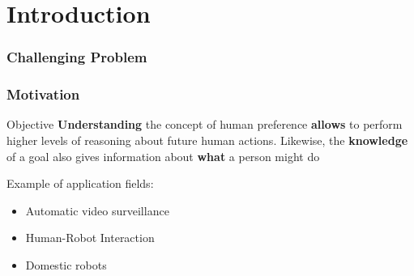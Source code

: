 \section{Introduction}


\begin{frame}
	\frametitle{Challenging Problem}
	
	\begin{center}
	\end{center}
\end{frame}

\begin{frame}
	\frametitle{Motivation}
	
	\vspace{0.2cm}
	
	\Large
	
	\begin{block}{Objective}
		\textbf{Understanding} the concept of human preference \textbf{allows} to perform higher levels
		of reasoning about future human actions. Likewise, the \textbf{knowledge} of a goal also gives
		information about \textbf{what} a person might do
	\end{block}
	
	\vspace{0.3cm}
	
	Example of application fields:
	\begin{itemize}
		\item Automatic video surveillance
		\item Human-Robot Interaction
		\item Domestic robots
	\end{itemize}
\end{frame}

